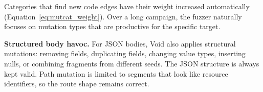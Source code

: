 \documentclass[conference]{IEEEtran}
\begin{document}
\begin{table}[htbp]
\caption{Mutation Categories with Adaptive Weights}
\label{tab:mutation_cats}
\centering
\footnotesize
\setlength{\tabcolsep}{3pt}
\end{table}

Categories that find new code edges have their weight increased automatically (Equation~\ref{eq:mutcat_weight}). Over a long campaign, the fuzzer naturally focuses on mutation types that are productive for the specific target.

\textbf{Structured body havoc.} For JSON bodies, Void also applies structural mutations: removing fields, duplicating fields, changing value types, inserting nulls, or combining fragments from different seeds. The JSON structure is always kept valid. Path mutation is limited to segments that look like resource identifiers, so the route shape remains correct.
\end{document}
